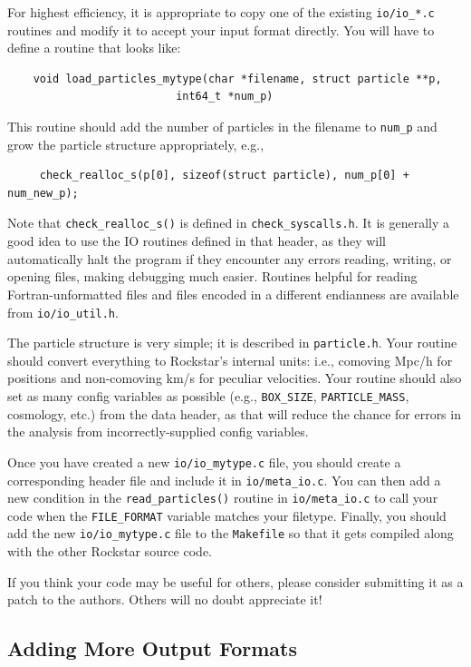 \documentclass[12pt]{article}
\begin{document}
For highest efficiency, it is appropriate to copy one of the existing \texttt{io/io\_*.c} routines and modify it to accept your input format directly.  You will have to define a routine that looks like:
\begin{verbatim}
    void load_particles_mytype(char *filename, struct particle **p, 
	       				  int64_t *num_p)
\end{verbatim}					  
This routine should add the number of particles in the filename to \texttt{num\_p} and grow the particle structure appropriately, e.g.,
\begin{verbatim}
     check_realloc_s(p[0], sizeof(struct particle), num_p[0] + num_new_p);
\end{verbatim}
Note that \texttt{check\_realloc\_s()} is defined in \texttt{check\_syscalls.h}.  It is generally a good idea to use the IO routines defined in that header, as they will automatically halt the program if they encounter any errors reading, writing, or opening files, making debugging much easier.  Routines helpful for reading Fortran-unformatted files and files encoded in a different endianness are available from \texttt{io/io\_util.h}.

The particle structure is very simple; it is described in \texttt{particle.h}.  Your routine should convert everything to Rockstar's internal units: i.e., comoving Mpc/h for positions and non-comoving km/s for peculiar velocities.  Your routine should also set as many config variables as possible (e.g., \texttt{BOX\_SIZE}, \texttt{PARTICLE\_MASS}, cosmology, etc.) from the data header, as that will reduce the chance for errors in the analysis from incorrectly-supplied config variables.

Once you have created a new \texttt{io/io\_mytype.c} file, you should create a corresponding header file and include it in \texttt{io/meta\_io.c}.  You can then add a new condition in the \texttt{read\_particles()} routine in \texttt{io/meta\_io.c} to call your code when the \texttt{FILE\_FORMAT} variable matches your filetype.  Finally, you should add the new \texttt{io/io\_mytype.c} file to the \texttt{Makefile} so that it gets compiled along with the other Rockstar source code.

If you think your code may be useful for others, please consider submitting it as a patch to the authors.  Others will no doubt appreciate it!

\subsection{Adding More Output Formats}
\end{document}

